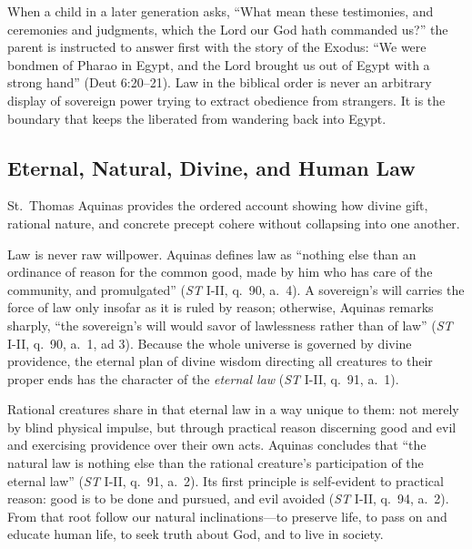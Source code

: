 When a child in a later generation asks, ``What mean these testimonies, and ceremonies and judgments, which the Lord our God hath commanded us?'' the parent is instructed to answer first with the story of the Exodus: ``We were bondmen of Pharao in Egypt, and the Lord brought us out of Egypt with a strong hand'' (Deut 6:20--21). Law in the biblical order is never an arbitrary display of sovereign power trying to extract obedience from strangers. It is the boundary that keeps the liberated from wandering back into Egypt.

\subsection{Eternal, Natural, Divine, and Human Law}

St.\ Thomas Aquinas provides the ordered account showing how divine gift, rational nature, and concrete precept cohere without collapsing into one another.

Law is never raw willpower. Aquinas defines law as ``nothing else than an ordinance of reason for the common good, made by him who has care of the community, and promulgated'' (\emph{ST} I-II, q.\ 90, a.\ 4). A sovereign's will carries the force of law only insofar as it is ruled by reason; otherwise, Aquinas remarks sharply, ``the sovereign's will would savor of lawlessness rather than of law'' (\emph{ST} I-II, q.\ 90, a.\ 1, ad 3). Because the whole universe is governed by divine providence, the eternal plan of divine wisdom directing all creatures to their proper ends has the character of the \emph{eternal law} (\emph{ST} I-II, q.\ 91, a.\ 1).

Rational creatures share in that eternal law in a way unique to them: not merely by blind physical impulse, but through practical reason discerning good and evil and exercising providence over their own acts. Aquinas concludes that ``the natural law is nothing else than the rational creature's participation of the eternal law'' (\emph{ST} I-II, q.\ 91, a.\ 2). Its first principle is self-evident to practical reason: good is to be done and pursued, and evil avoided (\emph{ST} I-II, q.\ 94, a.\ 2). From that root follow our natural inclinations---to preserve life, to pass on and educate human life, to seek truth about God, and to live in society.

